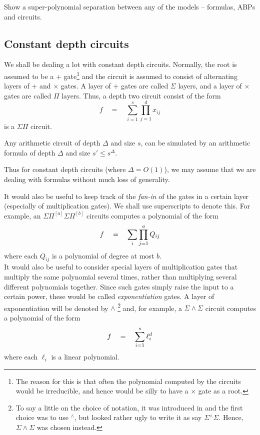 \begin{openproblem}
Show a super-polynomial separation between any of the models -- formulas, ABPs and circuits. 
\end{openproblem}

\subsection{Constant depth circuits}

We shall be dealing a lot with constant depth circuits. 
Normally, the root is assumed to be a $+$ gate\footnote{The reason for this is that often the polynomial computed by the circuits would be irreducible, and hence would be silly to have a $\times$ gate as a root.} and the circuit is assumed to consist of alternating layers of $+$ and $\times$ gates.
A layer of $+$ gates are called $\Sigma$ layers, and a layer of $\times$ gates are called $\Pi$ layers. 
Thus, a depth two circuit consist of the form 
\[
f\quad = \quad \sum_{i=1}^s \prod_{j=1}^d x_{ij}
\]
is a $\Sigma\Pi$ circuit. 

\begin{fact}
Any arithmetic circuit of depth $\Delta$ and size $s$, can be simulated by an arithmetic formula of depth $\Delta$ and size $s' \leq s^{\Delta}$. 
\end{fact}

Thus for constant depth circuits (where $\Delta = O(1)$), we may assume that we are dealing with formulas without much loss of generality.


It would also be useful to keep track of the \emph{fan-in} of the gates in a certain layer (especially of multiplication gates). 
We shall use superscripts to denote this. 
For example, an $\Sigma\Pi^{[a]}\Sigma\Pi^{[b]}$ circuits computes a polynomial of the form
\[
f \quad = \quad \sum_i \prod_{j=1}^a Q_{ij}
\]
where each $Q_{ij}$ is a polynomial of degree at most $b$. \\

It would also be useful to consider special layers of multiplication gates that multiply the same polynomial several times, rather than multiplying several different polynomials together. 
Since such gates simply raise the input to a certain power, these would be called \emph{exponentiation} gates. 
A layer of exponentiation will be denoted by $\wedge$ \footnote{To say a little on the choice of notation, it was introduced in \cite{gkks13b} and the first choice was to use ${}^{\wedge}$, but looked rather ugly to write it as say $\Sigma{}^{\wedge}\Sigma$. 
Hence, $\Sigma\!\wedge\!\Sigma$  was chosen instead. } and, for example, a $\Sigma\!\wedge\!\Sigma$ circuit computes a polynomial of the form 
\[
f\quad = \quad \sum_{i=1}^s \ell_{i}^d
\]
where each $\ell_i$ is a linear polynomial. \\

